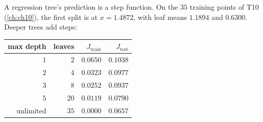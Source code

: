 A regression tree's prediction is a step function. On the $35$ training points
of T10 (\cref{ch:ch10}), the first split is at $x = 1.4872$, with leaf means
$1.1894$ and $0.6300$. Deeper trees add steps:

\begin{center}
\small
\renewcommand{\arraystretch}{1.12}
\begin{tabular}{@{}rrrr@{}}
\toprule
max depth & leaves & $J_{\text{train}}$ & $J_{\text{test}}$\\
\midrule
$1$ & $2$  & $0.0650$ & $0.1038$\\
$2$ & $4$  & $0.0323$ & $0.0977$\\
$3$ & $8$  & $0.0252$ & $0.0937$\\
$5$ & $20$ & $0.0119$ & $0.0790$\\
unlimited & $35$ & $0.0000$ & $0.0657$\\
\bottomrule
\end{tabular}
\end{center}

